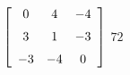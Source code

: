 {$\left[ \begin {array}{ccc} 0&4&-4\\\noalign{\medskip}3&1&-3
\\\noalign{\medskip}-3&-4&0\end {array} \right]$} 
{$72$}



  

